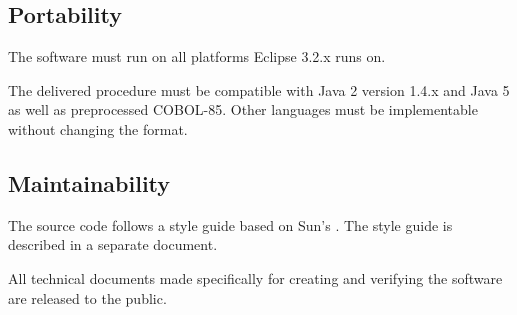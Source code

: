 \subsection{Portability}
The software must run on all platforms Eclipse 3.2.x runs on.
\par
The delivered  procedure must be compatible with Java 2 version 1.4.x and Java 5 as well as preprocessed COBOL-85. Other languages must be implementable without changing the  format.
\subsection{Maintainability}
The source code follows a style guide based on Sun's
. The
style guide is described in a separate document. 
\par
All technical documents made specifically for creating and verifying the software are released to the public.

